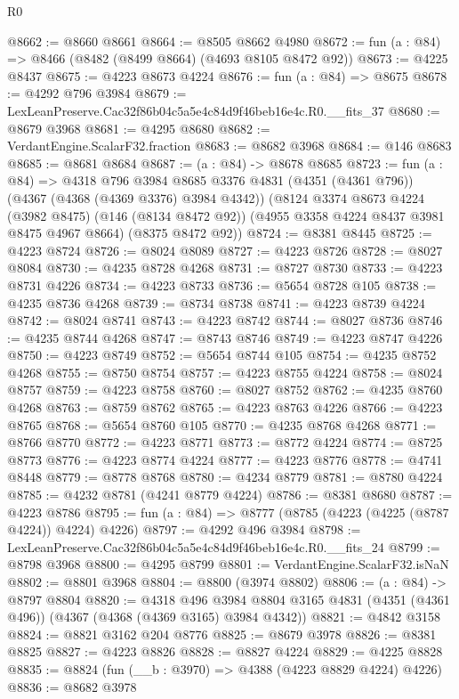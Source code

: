 \begin{lexlean}{R0}
\begin{coremodule}
@8662 := @8660 @8661
@8664 := @8505 @8662 @4980
@8672 := fun (a : @84) => @8466 (@8482 (@8499 @8664) (@4693 @8105 @8472 @92))
@8673 := @4225 @8437
@8675 := @4223 @8673 @4224
@8676 := fun (a : @84) => @8675
@8678 := @4292 @796 @3984
@8679 := LexLeanPreserve.Cac32f86b04c5a5e4c84d9f46beb16e4c.R0.__fits_37
@8680 := @8679 @3968
@8681 := @4295 @8680
@8682 := VerdantEngine.ScalarF32.fraction
@8683 := @8682 @3968
@8684 := @146 @8683
@8685 := @8681 @8684
@8687 := (a : @84) -> @8678 @8685
@8723 := fun (a : @84) =>
  @4318
    @796
    @3984
    @8685
    @3376
    @4831
    (@4351 (@4361 @796))
    (@4367 (@4368 (@4369 @3376) @3984 @4342))
    (@8124
      @3374
      @8673
      @4224
      (@3982 @8475)
      (@146 (@8134 @8472 @92))
      (@4955 @3358 @4224 @8437 @3981 @8475 @4967 @8664)
      (@8375 @8472 @92))
@8724 := @8381 @8445
@8725 := @4223 @8724
@8726 := @8024 @8089
@8727 := @4223 @8726
@8728 := @8027 @8084
@8730 := @4235 @8728 @4268
@8731 := @8727 @8730
@8733 := @4223 @8731 @4226
@8734 := @4223 @8733
@8736 := @5654 @8728 @105
@8738 := @4235 @8736 @4268
@8739 := @8734 @8738
@8741 := @4223 @8739 @4224
@8742 := @8024 @8741
@8743 := @4223 @8742
@8744 := @8027 @8736
@8746 := @4235 @8744 @4268
@8747 := @8743 @8746
@8749 := @4223 @8747 @4226
@8750 := @4223 @8749
@8752 := @5654 @8744 @105
@8754 := @4235 @8752 @4268
@8755 := @8750 @8754
@8757 := @4223 @8755 @4224
@8758 := @8024 @8757
@8759 := @4223 @8758
@8760 := @8027 @8752
@8762 := @4235 @8760 @4268
@8763 := @8759 @8762
@8765 := @4223 @8763 @4226
@8766 := @4223 @8765
@8768 := @5654 @8760 @105
@8770 := @4235 @8768 @4268
@8771 := @8766 @8770
@8772 := @4223 @8771
@8773 := @8772 @4224
@8774 := @8725 @8773
@8776 := @4223 @8774 @4224
@8777 := @4223 @8776
@8778 := @4741 @8448
@8779 := @8778 @8768
@8780 := @4234 @8779
@8781 := @8780 @4224
@8785 := @4232 @8781 (@4241 @8779 @4224)
@8786 := @8381 @8680
@8787 := @4223 @8786
@8795 := fun (a : @84) => @8777 (@8785 (@4223 (@4225 (@8787 @4224)) @4224) @4226)
@8797 := @4292 @496 @3984
@8798 := LexLeanPreserve.Cac32f86b04c5a5e4c84d9f46beb16e4c.R0.__fits_24
@8799 := @8798 @3968
@8800 := @4295 @8799
@8801 := VerdantEngine.ScalarF32.isNaN
@8802 := @8801 @3968
@8804 := @8800 (@3974 @8802)
@8806 := (a : @84) -> @8797 @8804
@8820 := @4318
    @496
    @3984
    @8804
    @3165
    @4831
    (@4351 (@4361 @496))
    (@4367 (@4368 (@4369 @3165) @3984 @4342))
@8821 := @4842 @3158
@8824 := @8821 @3162 @204 @8776
@8825 := @8679 @3978
@8826 := @8381 @8825
@8827 := @4223 @8826
@8828 := @8827 @4224
@8829 := @4225 @8828
@8835 := @8824 (fun (__b : @3970) => @4388 (@4223 @8829 @4224) @4226)
@8836 := @8682 @3978

\end{coremodule}
\end{lexlean}
